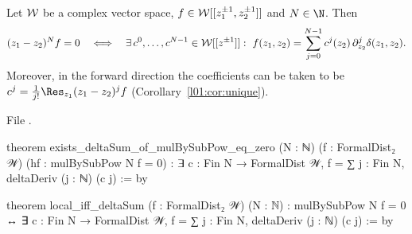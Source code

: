 \begin{theorem}\label{l01:thm:deltasum}
Let $\mathcal{W}$ be a complex vector space, $f\in\mathcal{W}[[z_1^{\pm1},z_2^{\pm1}]]$ and $N\in\N$. Then
\begin{equation*}
  (z_1-z_2)^Nf = 0\quad\Longleftrightarrow\quad
  \exists\,c^0,\dots,c^{N-1}\in\mathcal{W}[[z^{\pm1}]]:\ f(z_1,z_2) = \sum_{j=0}^{N-1}c^j(z_2)\,\partial_{z_2}^j\delta(z_1,z_2) .
\end{equation*}
Moreover, in the forward direction the coefficients can be taken to be
$c^j = \frac1{j!}\Res_{z_1}(z_1-z_2)^jf$ (Corollary~\ref{l01:cor:unique}).
\end{theorem}

\noindent File .
\begin{leancode}
theorem exists_deltaSum_of_mulBySubPow_eq_zero (N : ℕ) (f : FormalDist₂ 𝒲)
    (hf : mulBySubPow N f = 0) :
    ∃ c : Fin N → FormalDist 𝒲, f = ∑ j : Fin N, deltaDeriv (j : ℕ) (c j) := by

theorem local_iff_deltaSum (f : FormalDist₂ 𝒲) (N : ℕ) :
    mulBySubPow N f = 0 ↔
      ∃ c : Fin N → FormalDist 𝒲, f = ∑ j : Fin N, deltaDeriv (j : ℕ) (c j) := by
\end{leancode}


